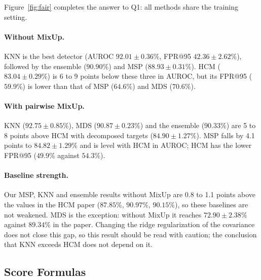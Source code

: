 \documentclass[letterpaper]{article} %
\begin{document}
Figure~\ref{fig:fair} completes the answer to Q1: all methods share the training setting.

\paragraph{Without MixUp.} KNN is the best detector (AUROC $92.01\pm0.36\%$, FPR@95 $42.36\pm2.62\%$), followed by the ensemble ($90.90\%$) and MSP ($88.93\pm0.31\%$). HCM ($83.04\pm0.29\%$) is 6 to 9 points below these three in AUROC, but its FPR@95 ($59.9\%$) is lower than that of MSP ($64.6\%$) and MDS ($70.6\%$).

\paragraph{With pairwise MixUp.} KNN ($92.75\pm0.85\%$), MDS ($90.87\pm0.23\%$) and the ensemble ($90.33\%$) are 5 to 8 points above HCM with decomposed targets ($84.90\pm1.27\%$). MSP falls by 4.1 points to $84.82\pm1.29\%$ and is level with HCM in AUROC; HCM has the lower FPR@95 ($49.9\%$ against $54.3\%$).

\paragraph{Baseline strength.} Our MSP, KNN and ensemble results without MixUp are 0.8 to 1.1 points above the values in the HCM paper ($87.85\%$, $90.97\%$, $90.15\%$), so these baselines are not weakened. MDS is the exception: without MixUp it reaches $72.90\pm2.38\%$ against $89.34\%$ in the paper. Changing the ridge regularization of the covariance does not close this gap, so this result should be read with caution; the conclusion that KNN exceeds HCM does not depend on it.

\subsection{Score Formulas}
\label{sec:cifar-formulas}
\end{document}
